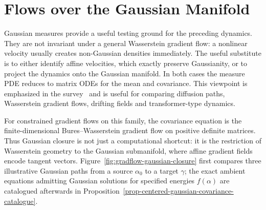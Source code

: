 \section{Flows over the Gaussian Manifold}
\label{sec-gaussian-closure-transport-dynamics}

Gaussian measures provide a useful testing ground for the preceding dynamics. They are not invariant under a general Wasserstein gradient flow: a nonlinear velocity usually creates non-Gaussian densities immediately. The useful substitute is to either identify affine velocities, which exactly preserve Gaussianity, or to project the dynamics onto the Gaussian manifold. In both cases the measure PDE reduces to matrix ODEs for the mean and covariance. This viewpoint is emphasized in the survey~\cite{Peyre2026OptimalDiffusionTransports} and is useful for comparing diffusion paths, Wasserstein gradient flows, drifting fields and transformer-type dynamics.

For constrained gradient flows on this family, the covariance equation is the finite-dimensional Bures--Wasserstein gradient flow on positive definite matrices. Thus Gaussian closure is not just a computational shortcut: it is the restriction of Wasserstein geometry to the Gaussian submanifold, where affine gradient fields encode tangent vectors. Figure~\ref{fig:gradflow-gaussian-closure} first compares three illustrative Gaussian paths from a source \(\alpha_0\) to a target \(\gamma\); the exact ambient equations admitting Gaussian solutions for specified energies \(f(\alpha)\) are catalogued afterwards in Proposition~\ref{prop-centered-gaussian-covariance-catalogue}.

